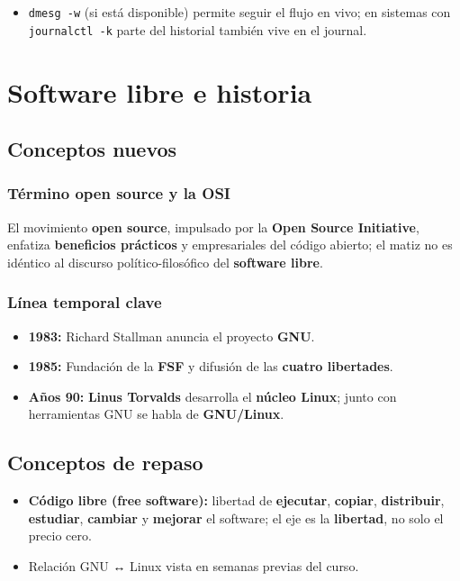 \documentclass[11pt, letterpaper]{article}
\begin{document}
\begin{itemize}
\item \texttt{dmesg -w} (si está disponible) permite seguir el flujo en vivo; en sistemas con \texttt{journalctl -k} parte del historial también vive en el journal.
\end{itemize}
\section{Software libre e historia}
\label{sec:orgc0f9691}

\subsection{Conceptos nuevos}
\label{sec:orgf497db7}

\subsubsection{Término \textbf{open source} y la OSI}
\label{sec:orgac61712}
El movimiento \textbf{open source}, impulsado por la \textbf{Open Source Initiative}, enfatiza \textbf{beneficios prácticos} y empresariales del código abierto; el matiz no es idéntico al discurso político-filosófico del \textbf{software libre}.
\subsubsection{Línea temporal clave}
\label{sec:org0a28cf6}
\begin{itemize}
\item \textbf{1983:} Richard Stallman anuncia el proyecto \textbf{GNU}.
\item \textbf{1985:} Fundación de la \textbf{FSF} y difusión de las \textbf{cuatro libertades}.
\item \textbf{Años 90:} \textbf{Linus Torvalds} desarrolla el \textbf{núcleo Linux}; junto con herramientas GNU se habla de \textbf{GNU/Linux}.
\end{itemize}
\subsection{Conceptos de repaso}
\label{sec:orgea6b8a0}

\begin{itemize}
\item \textbf{Código libre (free software):} libertad de \textbf{ejecutar}, \textbf{copiar}, \textbf{distribuir}, \textbf{estudiar}, \textbf{cambiar} y \textbf{mejorar} el software; el eje es la \textbf{libertad}, no solo el precio cero.
\item Relación GNU ↔ Linux vista en semanas previas del curso.
\end{itemize}
\end{document}
